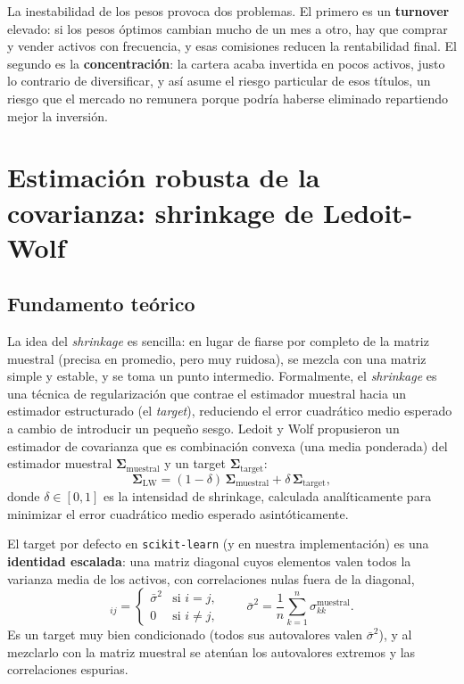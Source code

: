 La inestabilidad de los pesos provoca dos problemas. El primero es un
\textbf{turnover} elevado: si los pesos óptimos cambian mucho de un mes a otro,
hay que comprar y vender activos con frecuencia, y esas comisiones reducen la
rentabilidad final. El segundo es la \textbf{concentración}: la cartera acaba
invertida en pocos activos, justo lo contrario de diversificar, y así asume el
riesgo particular de esos títulos, un riesgo que el mercado no remunera porque
podría haberse eliminado repartiendo mejor la inversión.

\section{Estimación robusta de la covarianza: shrinkage de Ledoit-Wolf}
\label{sec:ledoit-wolf}

\subsection{Fundamento teórico}

La idea del \textit{shrinkage} es sencilla: en lugar de fiarse por completo de
la matriz muestral (precisa en promedio, pero muy ruidosa), se mezcla con una
matriz simple y estable, y se toma un punto intermedio. Formalmente, el
\textit{shrinkage} es una técnica de regularización que contrae el estimador
muestral hacia un estimador estructurado (el \textit{target}), reduciendo el
error cuadrático medio esperado a cambio de introducir un pequeño sesgo. Ledoit
y Wolf \cite{Ledoit2004} propusieron un estimador de covarianza que es
combinación convexa (una media ponderada) del estimador muestral
$\boldsymbol{\Sigma}_{\text{muestral}}$ y un target
$\boldsymbol{\Sigma}_{\text{target}}$:
\begin{equation}
    \boldsymbol{\Sigma}_{\text{LW}} = (1 - \delta)\,
    \boldsymbol{\Sigma}_{\text{muestral}} + \delta\,
    \boldsymbol{\Sigma}_{\text{target}},
    \label{eq:ledoit-wolf}
\end{equation}
donde $\delta \in [0, 1]$ es la intensidad de shrinkage, calculada
analíticamente para minimizar el error cuadrático medio esperado
asintóticamente.

El target por defecto en \texttt{scikit-learn} (y en nuestra implementación) es
una \textbf{identidad escalada}: una matriz diagonal cuyos elementos valen todos
la varianza media de los activos, con correlaciones nulas fuera de la diagonal,
\begin{equation}
    [\boldsymbol{\Sigma}_{\text{target}}]_{ij} =
    \begin{cases}
        \bar{\sigma}^2 & \text{si } i = j, \\
        0 & \text{si } i \neq j,
    \end{cases}
    \qquad
    \bar{\sigma}^2 = \frac{1}{n}\sum_{k=1}^{n} \sigma_{kk}^{\text{muestral}}.
    \label{eq:target-lw}
\end{equation}
Es un target muy bien condicionado (todos sus autovalores valen
$\bar{\sigma}^2$), y al mezclarlo con la matriz muestral se atenúan los
autovalores extremos y las correlaciones espurias.

